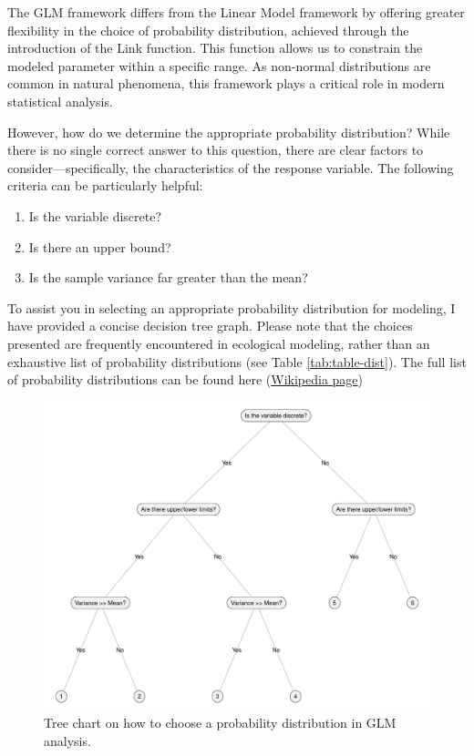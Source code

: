 \documentclass[
]{book}
\providecommand{\tightlist}{%
  \setlength{\itemsep}{0pt}\setlength{\parskip}{0pt}}
\begin{document}
The GLM framework differs from the Linear Model framework by offering greater flexibility in the choice of probability distribution, achieved through the introduction of the Link function. This function allows us to constrain the modeled parameter within a specific range. As non-normal distributions are common in natural phenomena, this framework plays a critical role in modern statistical analysis.

However, how do we determine the appropriate probability distribution? While there is no single correct answer to this question, there are clear factors to consider---specifically, the characteristics of the response variable. The following criteria can be particularly helpful:

\begin{enumerate}
\def\labelenumi{\arabic{enumi}.}
\tightlist
\item
  Is the variable discrete?
\item
  Is there an upper bound?
\item
  Is the sample variance far greater than the mean?
\end{enumerate}

To assist you in selecting an appropriate probability distribution for modeling, I have provided a concise decision tree graph. Please note that the choices presented are frequently encountered in ecological modeling, rather than an exhaustive list of probability distributions (see Table \ref{tab:table-dist}). The full list of probability distributions can be found here (\href{https://en.wikipedia.org/wiki/List_of_probability_distributions}{Wikipedia page})

\begin{figure}

{\centering \includegraphics[width=41.67in]{image/figure_dendro} 

}

\caption{Tree chart on how to choose a probability distribution in GLM analysis.}\label{fig:dendrogram}
\end{figure}
\end{document}
